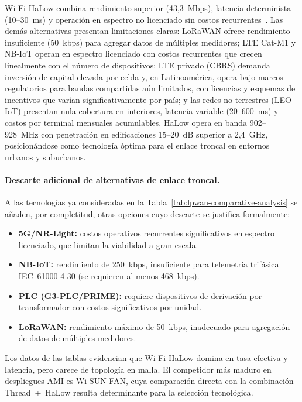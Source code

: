 Wi-Fi HaLow combina rendimiento superior (43,3~Mbps), latencia determinista (10--30~ms) y operación en espectro no licenciado sin costos recurrentes~\cite{qiaoSurveyWiFiHaLow2018,austIEEE80211ahSubOnegigahertz2012}. Las demás alternativas presentan limitaciones claras: LoRaWAN ofrece rendimiento insuficiente (50~kbps) para agregar datos de múltiples medidores; LTE Cat-M1 y NB-IoT operan en espectro licenciado con costos recurrentes que crecen linealmente con el número de dispositivos; LTE privado (CBRS) demanda inversión de capital elevada por celda y, en Latinoamérica, opera bajo marcos regulatorios para bandas compartidas aún limitados, con licencias y esquemas de incentivos que varían significativamente por país; y las redes no terrestres (LEO-IoT) presentan nula cobertura en interiores, latencia variable (20--600~ms) y costos por terminal mensuales acumulables. HaLow opera en banda 902--928~MHz con penetración en edificaciones 15--20~dB superior a 2,4~GHz, posicionándose como tecnología óptima para el enlace troncal en entornos urbanos y suburbanos.

\paragraph{Descarte adicional de alternativas de enlace troncal.}
A las tecnologías ya consideradas en la Tabla~\ref{tab:lpwan-comparative-analysis} se añaden, por completitud, otras opciones cuyo descarte se justifica formalmente:

\begin{itemize}
    \item \textbf{5G/NR-Light:} costos operativos recurrentes significativos en espectro licenciado, que limitan la viabilidad a gran escala.
    \item \textbf{NB-IoT:} rendimiento de 250~kbps, insuficiente para telemetría trifásica IEC~61000-4-30 (se requieren al menos 468~kbps).
    \item \textbf{PLC (G3-PLC/PRIME):} requiere dispositivos de derivación por transformador con costos significativos por unidad.
    \item \textbf{LoRaWAN:} rendimiento máximo de 50~kbps, inadecuado para agregación de datos de múltiples medidores.
\end{itemize}

Los datos de las tablas evidencian que Wi-Fi HaLow domina en tasa efectiva y latencia, pero carece de topología en malla. El competidor más maduro en despliegues AMI es Wi-SUN FAN, cuya comparación directa con la combinación Thread~+~HaLow resulta determinante para la selección tecnológica.


